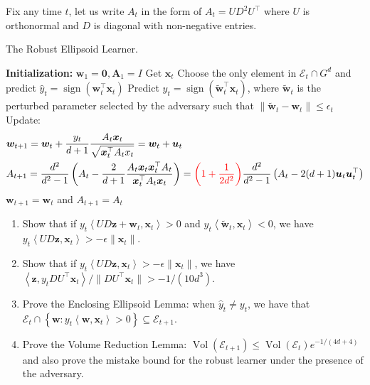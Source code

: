 \documentclass[12pt,letterpaper]{article}
\def \z{\boldsymbol{z}}
\def \w{\boldsymbol{w}}
\def \x{\boldsymbol{x}}
\DeclareMathOperator*{\sign}{sign}
\begin{document}
\begin{enumerate}
Fix any time $t$, let us write $A_t$ in the form of $A_t=UD^2U^\top$ where $U$ is  orthonormal and $D$ is diagonal with non-negative entries.


\begin{algorithm}[h]
\caption{The Robust Ellipsoid Learner.}
\label{alg2}
\begin{algorithmic}[1]
    \State \textbf{Initialization:}  $\boldsymbol{w}_{1}=\mathbf{0}, \boldsymbol{A}_{1}=I$
      \State Get $\x_t$
       \State Choose the only element in $\mathcal{E}_{t} \cap G^{d}$ and predict $\hat{y}_{t}=\sign\left(\boldsymbol{w}_{t}^{\top} \boldsymbol{x}_{t}\right)$
\Else
\State Predict $\hat{y}_{t}=\sign\left(\tilde{\boldsymbol{w}}_{t}^{\top} \boldsymbol{x}_{t}\right)$, where $\tilde{\boldsymbol{w}}_{t}$ is the perturbed parameter selected by the adversary such that $\|\tilde{\boldsymbol{w}}_{t}- \boldsymbol{w}_{t}\|\leq \epsilon_t$ \label{line:alg2-7}
\EndIf
       \State Update: \label{line:alg2-10}
\[
\begin{aligned}
&\boldsymbol{w}_{t+1}=\boldsymbol{w}_{t}+\frac{y_{t}}{d+1} \frac{A_{t} \x_{t}}{\sqrt{\x_{t}^{\top} A_{t} x_{t}}}=\boldsymbol{w}_{t}+\boldsymbol{u}_{t} \\
&A_{t+1}=\frac{d^{2}}{d^{2}-1}\left(A_{t}-\frac{2}{d+1} \frac{A_{t} \x_{t} \x_{t}^{\top} A_{t}}{\x_{t}^{\top} A_{t} \x_{t}}\right)=\textcolor{red}{\left(1+\frac{1}{2d^2}\right)}\frac{d^{2}}{d^{2}-1}\left(A_{t}-2(d+1) \boldsymbol{u}_{t} \boldsymbol{u}_{t}^{\top}\right)
\end{aligned}
\]
       \Else 
       \State  $\boldsymbol{w}_{t+1}=\boldsymbol{w}_{t}$ and $A_{t+1}=A_{t}$
       \EndIf

    \EndFor
\end{algorithmic}
\end{algorithm}

\begin{enumerate}[label=(\alph*)]
    \item Show that if  $y_{t}\left\langle UD \z+\w_{t}, \x_{t}\right\rangle>0$  and  $y_{t}\left\langle\tilde{\w}_{t}, \x_{t}\right\rangle<0$, we have $y_{t}\left\langle UD \z, \x_{t}\right\rangle>-\epsilon\|\x_t\|$.
    \item Show that if  $y_{t}\left\langle UD \z, \x_{t}\right\rangle>-\epsilon\|\x_t\|$, we have $\left\langle \z, y_{t}DU^\top \x_{t}\right\rangle/\|DU^\top \x_t\|>-1/(10d^3)$.
    \item Prove the Enclosing Ellipsoid Lemma: when $\hat{y}_{t} \neq y_{t}$, we have that \\$\mathcal{E}_{t}  \cap\left\{\boldsymbol{w}: y_{t}\left\langle\boldsymbol{w}, \boldsymbol{x}_{t}\right\rangle>0\right\} \subseteq \mathcal{E}_{t+1}$. 
    \item Prove the Volume Reduction Lemma: $\operatorname{Vol}(\mathcal{E}_{t+1})\leq \operatorname{Vol}(\mathcal{E}_t)e^{-1/(4d+4)}$ and also prove the mistake bound for the robust learner under the presence of the adversary.
\end{enumerate}


\end{enumerate}
\end{document}
